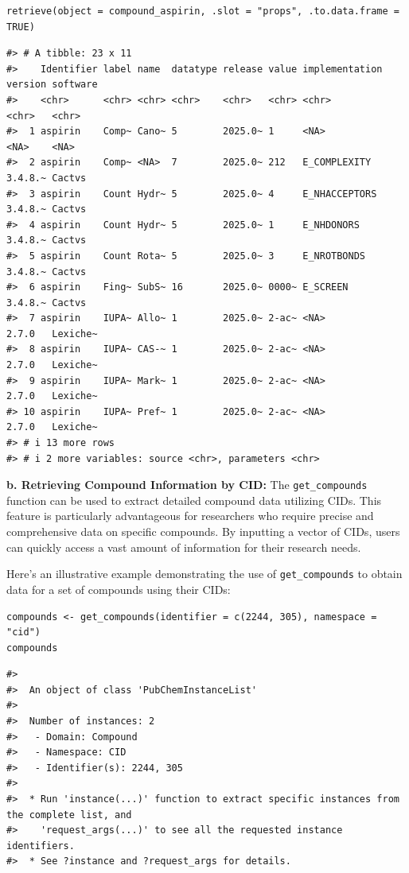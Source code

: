 \begin{verbatim}
retrieve(object = compound_aspirin, .slot = "props", .to.data.frame = TRUE)
\end{verbatim}

\begin{verbatim}
#> # A tibble: 23 x 11
#>    Identifier label name  datatype release value implementation version software
#>    <chr>      <chr> <chr> <chr>    <chr>   <chr> <chr>          <chr>   <chr>   
#>  1 aspirin    Comp~ Cano~ 5        2025.0~ 1     <NA>           <NA>    <NA>    
#>  2 aspirin    Comp~ <NA>  7        2025.0~ 212   E_COMPLEXITY   3.4.8.~ Cactvs  
#>  3 aspirin    Count Hydr~ 5        2025.0~ 4     E_NHACCEPTORS  3.4.8.~ Cactvs  
#>  4 aspirin    Count Hydr~ 5        2025.0~ 1     E_NHDONORS     3.4.8.~ Cactvs  
#>  5 aspirin    Count Rota~ 5        2025.0~ 3     E_NROTBONDS    3.4.8.~ Cactvs  
#>  6 aspirin    Fing~ SubS~ 16       2025.0~ 0000~ E_SCREEN       3.4.8.~ Cactvs  
#>  7 aspirin    IUPA~ Allo~ 1        2025.0~ 2-ac~ <NA>           2.7.0   Lexiche~
#>  8 aspirin    IUPA~ CAS-~ 1        2025.0~ 2-ac~ <NA>           2.7.0   Lexiche~
#>  9 aspirin    IUPA~ Mark~ 1        2025.0~ 2-ac~ <NA>           2.7.0   Lexiche~
#> 10 aspirin    IUPA~ Pref~ 1        2025.0~ 2-ac~ <NA>           2.7.0   Lexiche~
#> # i 13 more rows
#> # i 2 more variables: source <chr>, parameters <chr>
\end{verbatim}

\textbf{b. Retrieving Compound Information by CID:} The \texttt{get\_compounds} function can be used to extract detailed compound data utilizing CIDs. This feature is particularly advantageous for researchers who require precise and comprehensive data on specific compounds. By inputting a vector of CIDs, users can quickly access a vast amount of information for their research needs.

Here's an illustrative example demonstrating the use of \texttt{get\_compounds} to obtain data for a set of compounds using their CIDs:

\begin{verbatim}
compounds <- get_compounds(identifier = c(2244, 305), namespace = "cid") 
compounds
\end{verbatim}

\begin{verbatim}
#> 
#>  An object of class 'PubChemInstanceList'
#> 
#>  Number of instances: 2
#>   - Domain: Compound
#>   - Namespace: CID
#>   - Identifier(s): 2244, 305
#> 
#>  * Run 'instance(...)' function to extract specific instances from the complete list, and
#>    'request_args(...)' to see all the requested instance identifiers.
#>  * See ?instance and ?request_args for details.
\end{verbatim}

